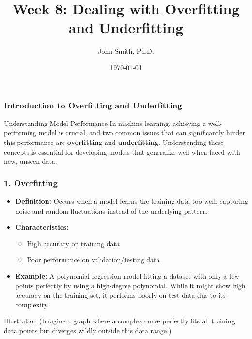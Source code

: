 \documentclass[aspectratio=169]{beamer}
\title[Dealing with Overfitting and Underfitting]{Week 8: Dealing with Overfitting and Underfitting}
\author[J. Smith]{John Smith, Ph.D.}
\institute[University Name]{
  Department of Computer Science\\
  University Name\\
  \vspace{0.3cm}
  Email: email@university.edu\\
  Website: www.university.edu
}
\date{\today}
\begin{document}
\frame{\titlepage}

\begin{frame}[fragile]
    \frametitle{Introduction to Overfitting and Underfitting}
    \begin{block}{Understanding Model Performance}
        In machine learning, achieving a well-performing model is crucial, and two common issues that can significantly hinder this performance are \textbf{overfitting} and \textbf{underfitting}. 
        Understanding these concepts is essential for developing models that generalize well when faced with new, unseen data.
    \end{block}
\end{frame}

\begin{frame}[fragile]
    \frametitle{1. Overfitting}
    \begin{itemize}
        \item \textbf{Definition:} Occurs when a model learns the training data too well, capturing noise and random fluctuations instead of the underlying pattern.
        \item \textbf{Characteristics:}
        \begin{itemize}
            \item High accuracy on training data
            \item Poor performance on validation/testing data
        \end{itemize}
        \item \textbf{Example:} A polynomial regression model fitting a dataset with only a few points perfectly by using a high-degree polynomial. 
        While it might show high accuracy on the training set, it performs poorly on test data due to its complexity.
    \end{itemize}
    \begin{block}{Illustration}
        (Imagine a graph where a complex curve perfectly fits all training data points but diverges wildly outside this data range.)
    \end{block}
\end{frame}
\end{document}

